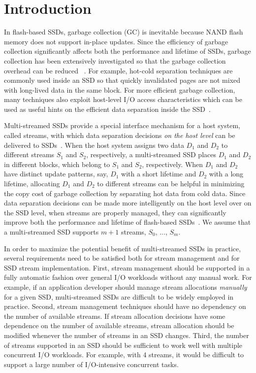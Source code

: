 \vspace{-12pt}
\section{Introduction}
\label{sec:intro}
\vspace{-4pt}
In flash-based SSDs, garbage collection (GC) is inevitable because NAND flash
memory does not support in-place updates.  Since the efficiency of garbage
collection significantly affects  both the performance and lifetime of SSDs,
garbage collection has been extensively investigated so that the garbage
collection overhead can be reduced ~\cite{DAC, WriteAmplification, GCGreedy,
GCVictim, GCTTFlash, HotCold}.  For example, hot-cold separation techniques are
commonly used inside an SSD so that quickly invalidated pages are not mixed
with long-lived data in the same block.   For more efficient garbage
collection, many techniques also exploit host-level I/O access characteristics
which can be used as useful hints on the efficient data separation inside the
SSD~\cite{JiTGC, ShadowGC}.

Multi-streamed SSDs provide a special interface mechanism for a host system,
called streams, with which data separation decisions {\it on the
host level} can be delivered to SSDs~\cite{T10, MultiStream}.  When the host
system assigns two data $D_1$ and $D_2$ to different streams $S_1$ and $S_2$,
respectively, a multi-streamed SSD places $D_1$ and $D_2$ in different blocks,
which belong to $S_1$ and $S_2$, respectively.  When $D_1$ and $D_2$ have
distinct update patterns, say, $D_1$ with a short lifetime and $D_2$ with a
long lifetime, allocating $D_1$ and $D_2$ to different streams can be helpful
in minimizing the copy cost of garbage collection by separating hot data from
cold data.  Since data separation decisions can be made more intelligently on
the host level over on the SSD level, when streams are properly managed, they
can significantly improve both the performance and lifetime of flash-based
SSDs~\cite{MultiStream, Level,vStream, FStream, AutoStream}.  We assume that a
multi-streamed SSD supports $m+1$ streams, $S_0$, ..., $S_{m}$.

In order to maximize the potential benefit of multi-streamed SSDs in practice,
several requirements need to be satisfied both for stream management and for
SSD stream implementation.  First, stream management should be supported in a
fully automatic fashion over general I/O workloads without any manual work.
For example, if an application developer should manage stream allocations {\it
manually} for a given SSD, multi-streamed SSDs are difficult to be widely
employed in practice.   Second, stream management techniques should have no
dependency on the number of available streams.  If stream allocation decisions
have some dependence on the number of available streams,  stream allocation
should be modified whenever the number of streams in an SSD changes.  Third,
the number of streams supported in an SSD should be sufficient to work well
with multiple concurrent I/O workloads.  For example, with 4 streams, it would
be difficult to support a large number of I/O-intensive concurrent tasks.  


